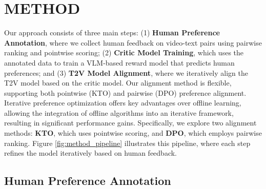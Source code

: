 \section{METHOD}
\label{sec:method} 

Our approach consists of three main steps: (1) \textbf{Human Preference Annotation}, where we collect human feedback on video-text pairs using pairwise ranking and pointwise scoring; (2) \textbf{Critic Model Training}, which uses the annotated data to train a VLM-based reward model that predicts human preferences; and (3) \textbf{T2V Model Alignment}, where we iteratively align the T2V model based on the critic model. Our alignment method is flexible, supporting both pointwise (KTO) and pairwise (DPO) preference alignment. Iterative preference optimization offers key advantages over offline learning, allowing the integration of offline algorithms into an iterative framework, resulting in significant performance gains. Specifically, we explore two alignment methods: \textbf{KTO}, which uses pointwise scoring, and \textbf{DPO}, which employs pairwise ranking. Figure \ref{fig:method_pipeline} illustrates this pipeline, where each step refines the model iteratively based on human feedback.


\subsection{Human Preference Annotation}
\label{collect dataset}

